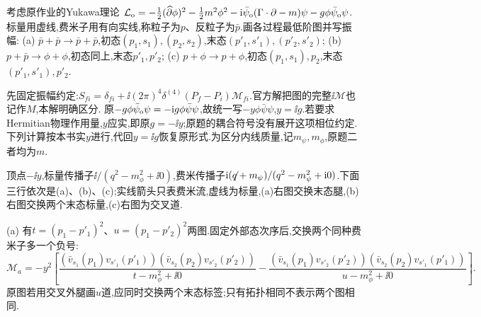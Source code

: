 \begin{exercise}
考虑原作业的Yukawa理论
$\mathcal L_{\rm o}=-\frac12(\widehat\partial\phi)^2-\frac12m^2\phi^2-\mathrm i\bar\psi_{\rm o}(\Gamma\cdot\partial-m)\psi-g\phi\bar\psi_{\rm o}\psi$.
标量用虚线,费米子用有向实线,称粒子为$p$、反粒子为$\bar p$.画各过程最低阶图并写振幅:
(a) $\bar p+\bar p\to\bar p+\bar p$,初态$(p_1,s_1),(p_2,s_2)$,末态$(p'_1,s'_1),(p'_2,s'_2)$;
(b) $p+\bar p\to\phi+\phi$,初态同上,末态$p'_1,p'_2$;
(c) $p+\phi\to p+\phi$,初态$(p_1,s_1),p_2$,末态$(p'_1,s'_1),p'_2$.
\end{exercise}
\begin{solution}
先固定振幅约定:$S_{fi}=\delta_{fi}+\ii(2\pi)^4\delta^{(4)}(P_f-P_i)\mathcal M_{fi}$.官方解把图的完整$\ii\mathcal M$也记作$M$,本解明确区分.
原$-g\phi\bar\psi_{\rm o}\psi=-\mathrm i g\phi\bar\psi\psi$,故统一写$-y\phi\bar\psi\psi$,$y=\ii g$.若要求Hermitian物理作用量,$y$应实,即原$g=-\ii y$;原题的耦合符号没有展开这项相位约定.下列计算按本书实$y$进行,代回$y=\ii g$恢复原形式.为区分内线质量,记$m_\psi,m_\phi$,原题二者均为$m$.

顶点$-\ii y$,标量传播子$\ii/(q^2-m_\phi^2+\ii0)$,费米传播子$\mathrm i(\mathord{\not\mathrel{q}}+m_\psi)/(q^2-m_\psi^2+\mathrm i0)$.下面三行依次是(a)、(b)、(c);实线箭头只表费米流,虚线为标量,(a)右图交换末态腿,(b)右图交换两个末态标量,(c)右图为交叉道.
\begin{center}\end{center}
(a) 有$t=(p_1-p'_1)^2$、$u=(p_1-p'_2)^2$两图.固定外部态次序后,交换两个同种费米子多一个负号:
\[
 \mathcal M_a=-y^2\left[
 \frac{(\bar v_{s_1}(p_1)v_{s'_1}(p'_1))(\bar v_{s_2}(p_2)v_{s'_2}(p'_2))}{t-m_\phi^2+\ii0}
 -\frac{(\bar v_{s_1}(p_1)v_{s'_2}(p'_2))(\bar v_{s_2}(p_2)v_{s'_1}(p'_1))}{u-m_\phi^2+\ii0}\right].
\]
原图若用交叉外腿画$u$道,应同时交换两个末态标签;只有拓扑相同不表示两个图相同.


\end{solution}

